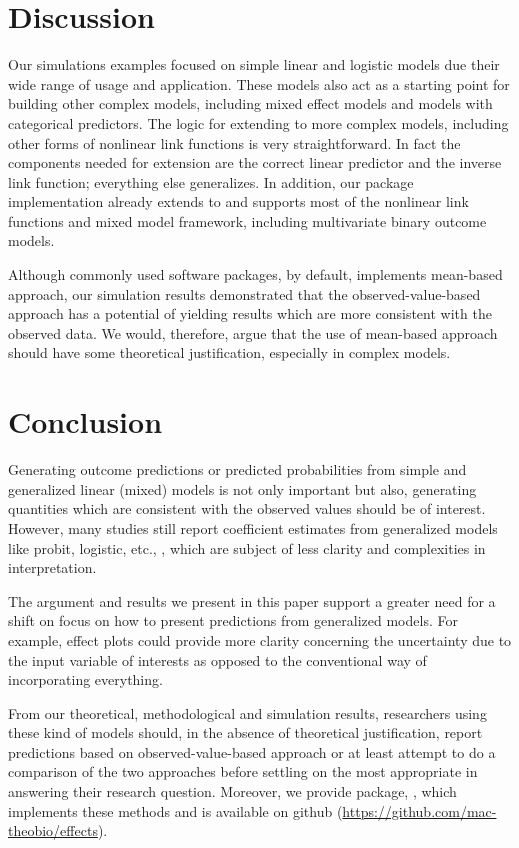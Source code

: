 \section{Discussion}

Our simulations examples focused on simple linear and logistic models due their wide range of usage and application. These models also act as a starting point for building other complex models, including mixed effect models and models with categorical predictors. The logic for extending to more complex models, including other forms of nonlinear link functions is very straightforward. In fact the components needed for extension are the correct linear predictor and the inverse link function; everything else generalizes. In addition, our  package implementation already extends to and supports most of the nonlinear link functions and mixed model framework, including multivariate binary outcome models.

Although commonly used  software packages, by default, implements mean-based approach, our simulation results demonstrated that the observed-value-based approach has a potential of yielding results which are more consistent with the observed data. We would, therefore, argue that the use of mean-based approach should have some theoretical justification, especially in complex models. 

\section{Conclusion}

Generating outcome predictions or predicted probabilities from simple and generalized linear (mixed) models is not only important but also, generating quantities which are consistent with the observed values should be of interest. However, many studies still report coefficient estimates from generalized models like probit, logistic, etc., \citep{hanmer2013behind}, which are subject of less clarity and complexities in interpretation.

The argument and results we present in this paper support a greater need for a shift on focus on how to present predictions from generalized models. For example, effect plots could provide more clarity concerning the uncertainty due to the input variable of interests as opposed to the conventional way of incorporating everything. 

From our theoretical, methodological and simulation results, researchers using these kind of models should, in the absence of theoretical justification, report predictions based on observed-value-based approach or at least attempt to do a comparison of the two approaches before settling on the most appropriate in answering their research question. Moreover, we provide  package, , which implements these methods and is available on github (\href{https://github.com/mac-theobio/effects}{https://github.com/mac-theobio/effects}).


